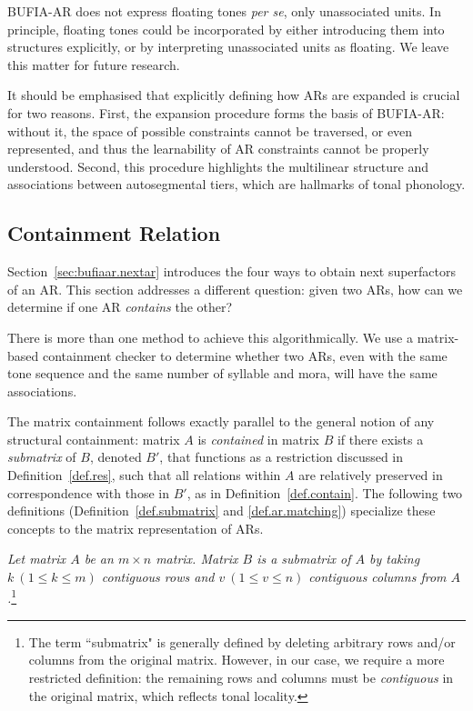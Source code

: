 BUFIA-AR does not express floating tones \textit{per se}, only unassociated
units. In principle, floating tones could be incorporated by either
introducing them into structures explicitly, or by interpreting
unassociated units as floating. We leave this matter for future research.

It should be emphasised that explicitly defining how ARs are expanded
is crucial for two reasons. First, the expansion procedure forms the
basis of BUFIA-AR: without it, the space of possible constraints cannot
be traversed, or even represented, and thus the learnability of AR
constraints cannot be properly understood.  Second, this procedure
highlights the multilinear structure and associations between
autosegmental tiers, which are hallmarks of tonal phonology. 


\subsection{Containment Relation}\label{sec:bufiaar.arcontain}

Section~\ref{sec:bufiaar.nextar} introduces the four ways to obtain next 
superfactors of an AR. This section addresses a different question: 
given two ARs, how can we determine if one AR \textit{contains} the other? 



There is more than one method to achieve this algorithmically.
We use a matrix-based containment checker to determine whether two 
ARs, even with the same tone sequence and the same number of syllable 
and mora, will have the same associations.

The matrix containment follows exactly parallel to the general notion
of any structural containment: matrix $A$ is \textit{contained} in
matrix $B$ if there exists a \textit{submatrix} of $B$, denoted $B'$,
that functions as a restriction discussed in Definition~\ref{def.res}, such that all
relations within $A$ are relatively preserved in correspondence with
those in $B'$, as in Definition~\ref{def.contain}.
The following two definitions (Definition~\ref{def.submatrix} and 
\ref{def.ar.matching}) specialize these concepts to the matrix 
representation of ARs.

\begin{definition}
	\label{def.submatrix}
	\textit{Let matrix $A$ be an $m \times n$ matrix.  Matrix $B$ is a
		\emph{submatrix}
		of $A$ by taking $k \ (1 \leq k \leq m)$ contiguous rows and $v \ (1 \leq v
		\leq n)$ contiguous columns from $A$.}\footnote{The term ``submatrix" is
		generally defined by deleting arbitrary rows and/or columns from the original
		matrix. However, in our case, we require a more restricted definition: the
		remaining rows and columns must be \textit{contiguous} in the original matrix,
		which reflects tonal locality.}
\end{definition}


